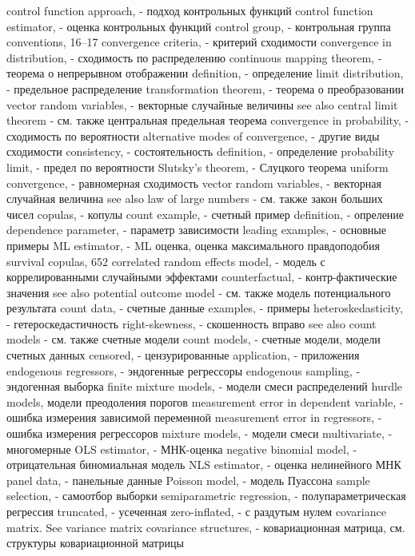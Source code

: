 control function approach, - подход контрольных функций 
control function estimator, - оценка контрольных функций
control group, - контрольная группа
conventions, 16–17
convergence criteria, - критерий сходимости
convergence in distribution, - сходимость по распределению
continuous mapping theorem, - теорема о непрерывном отображении
definition, - определение
limit distribution, - предельное распределение
transformation theorem, - теорема о преобразовании 
vector random variables, - векторные случайные величины
see also central limit theorem - см. также центральная предельная теорема
convergence in probability, - сходимость по вероятности
alternative modes of convergence, - другие виды сходимости
consistency, - состоятельность
definition, - определение
probability limit, - предел по вероятности
Slutsky’s theorem, - Слуцкого теорема 
uniform convergence, - равномерная сходимость 
vector random variables, - векторная случайная величина 
see also law of large numbers - см. также закон больших чисел
copulas, - копулы
count example, - счетный пример
definition, - опреление
dependence parameter, - параметр зависимости
leading examples, - основные примеры
ML estimator, - ML оценка, оценка максимального правдоподобия
survival copulas, 652
correlated random effects model, - модель с коррелированными случайными эффектами 
counterfactual, - контр-фактические значения
see also potential outcome model - см. также модель потенциального результата
count data, - счетные данные
examples, - примеры
heteroskedasticity, - гетероскедастичность
right-skewness, - скошенность вправо
see also count models - см. также счетные модели
count models, - счетные модели, модели счетных данных
censored, - цензурированные
application, - приложения
endogenous regressors, - эндогенные регрессоры 
endogenous sampling, - эндогенная выборка
finite mixture models, - модели смеси распределений
hurdle models, модели преодоления порогов
measurement error in dependent variable, - ошибка измерения зависимой переменной 
measurement error in regressors, - ошибка измерения регрессоров 
mixture models, - модели смеси
multivariate, - многомерные
OLS estimator, - МНК-оценка
negative binomial model, - отрицательная биномиальная модель
NLS estimator, - оценка нелинейного МНК
panel data, - панельные данные
Poisson model, - модель Пуассона
sample selection, - самоотбор выборки
semiparametric regression, - полупараметрическая регрессия
truncated, - усеченная
zero-inflated, - с раздутым нулем
covariance matrix. See variance matrix covariance structures, - ковариационная матрица, см. структуры ковариационной матрицы 

